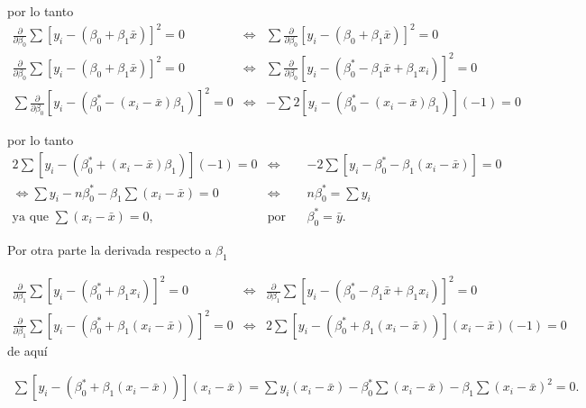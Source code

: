 \documentclass[12pt]{article}
\begin{document}
por lo tanto
\begin{eqnarray*}
\frac{\partial}{\partial \beta_0} \sum \left[ y_i - \left( \beta_0 + \beta_1 \bar{x} \right) \right]^2 =0
&\Leftrightarrow& \sum \frac{\partial}{\partial \beta_0} \left[ y_i - (\beta_0 + \beta_1 \bar{x}) \right]^2 = 0\\
\frac{\partial}{\partial \beta_0} \sum \left[ y_i - (\beta_0 + \beta_1 \bar{x}) \right]^2 = 0&\Leftrightarrow& \sum \frac{\partial}{\partial \beta_0} \left[ y_i - \left( \beta_0^* - \beta_1 \bar{x} + \beta_1 x_i \right) \right]^2 = 0\\
\sum \frac{\partial}{\partial \beta_0} \left[ y_i - \left( \beta_0^* - (x_i - \bar{x}) \beta_1 \right) \right]^2 = 0&\Leftrightarrow& - \sum 2 \left[ y_i - \left( \beta_0^* - (x_i - \bar{x}) \beta_1 \right) \right](-1) = 0
\end{eqnarray*}

por lo tanto
\begin{eqnarray*}
2 \sum \left[ y_i - \left( \beta_0^* + (x_i - \bar{x}) \beta_1 \right) \right] (-1) = 0&\Leftrightarrow&
-2 \sum \left[ y_i - \beta_0^* - \beta_1 (x_i - \bar{x}) \right] = 0\\
\Leftrightarrow \sum y_i - n \beta_0^* - \beta_1 \sum (x_i - \bar{x}) = 0
&\Leftrightarrow& n \beta_0^* = \sum y_i \\
\textrm{ya que } \sum (x_i - \bar{x}) = 0,
&\textrm{por lo tanto}&\beta_0^* = \bar{y}.
\end{eqnarray*}

Por otra parte la derivada respecto a $\beta_1$

\begin{eqnarray*}
\frac{\partial}{\partial \beta_1} \sum \left[ y_i - \left( \beta_0^* + \beta_1 x_i \right) \right]^2 = 0
&\Leftrightarrow&\frac{\partial}{\partial \beta_1} \sum \left[ y_i - \left( \beta_0^* - \beta_1 \bar{x} + \beta_1 x_i \right) \right]^2 = 0\\
\frac{\partial}{\partial \beta_1} \sum \left[ y_i - \left( \beta_0^* + \beta_1 (x_i - \bar{x}) \right) \right]^2 = 0&\Leftrightarrow&
2 \sum \left[ y_i - \left( \beta_0^* + \beta_1 (x_i - \bar{x}) \right) \right](x_i - \bar{x}) (-1) = 0
\end{eqnarray*}
de aqu\'i

\begin{eqnarray*}
\sum \left[ y_i - \left( \beta_0^* + \beta_1 (x_i - \bar{x}) \right) \right](x_i - \bar{x})=\sum y_i (x_i - \bar{x}) - \beta_0^* \sum (x_i - \bar{x}) - \beta_1 \sum (x_i - \bar{x})^2 = 0.
\end{eqnarray*}
\end{document}
